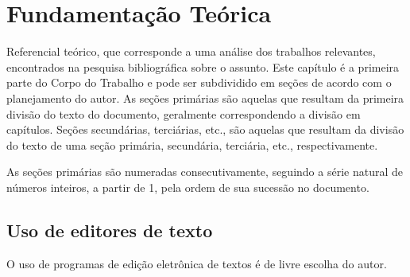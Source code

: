 \chapter[Fundamentação Teórica]{Fundamentação Teórica}

Referencial teórico, que corresponde a uma análise dos trabalhos relevantes, encontrados na pesquisa bibliográfica sobre o assunto. Este capítulo é a primeira parte do Corpo do Trabalho e pode ser subdividido em seções de acordo com o planejamento do autor. As seções primárias são aquelas que  resultam da primeira divisão do texto do documento, geralmente correspondendo a divisão em capítulos. Seções secundárias, terciárias, etc., são aquelas que resultam da divisão do texto de uma seção primária, secundária, terciária, etc., respectivamente.

As seções primárias são numeradas consecutivamente, seguindo a série natural de números inteiros, a partir de 1, pela ordem de sua sucessão no 
documento.


\section{Uso de editores de texto}

O uso de programas de edição eletrônica de textos é de livre escolha do autor. 

